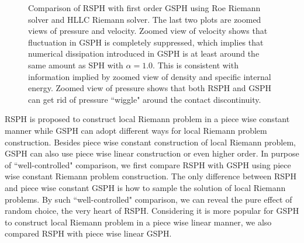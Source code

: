 \begin{figure}[H]
\begin{minipage}{.545\textwidth}
\begin{flushleft}
        \end{flushleft}
    \end{minipage}%
    \caption{Comparison of RSPH with first order GSPH using Roe Riemann solver and HLLC Riemann solver. The last two plots are zoomed views of pressure and velocity. Zoomed view of velocity shows that fluctuation in GSPH is completely suppressed, which implies that numerical dissipation introduced in GSPH is at least around the same amount as SPH with $\alpha=1.0$. This is consistent with information implied by zoomed view of density and specific internal energy. Zoomed view of pressure shows that both RSPH and GSPH can get rid of pressure ``wiggle" around the contact discontinuity.}
    \label{fig:RCM-Sod-GSPH}
\end{figure}

RSPH is proposed to construct local Riemann problem in a piece wise constant manner while GSPH can adopt different ways for local Riemann problem construction. Besides piece wise constant construction of local Riemann problem, GSPH can also use piece wise linear construction or even higher order. In purpose of ``well-controlled" comparison, we first compare RSPH with GSPH using piece wise constant Riemann problem construction. The only difference between RSPH and piece wise constant GSPH is how to sample the solution of local Riemann problems. By such ``well-controlled" comparison, we can reveal the pure effect of random choice, the very heart of RSPH. Considering it is more popular for GSPH to construct local Riemann problem in a piece wise linear manner, we also compared RSPH with piece wise linear GSPH.

